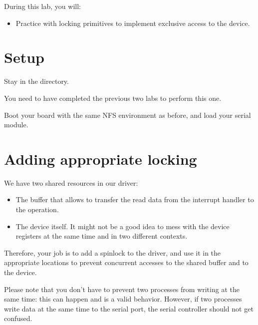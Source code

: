 
During this lab, you will:

\begin{itemize}
\item Practice with locking primitives to implement exclusive access
  to the device.
\end{itemize}

\section{Setup}

Stay in the  directory.

You need to have completed the previous two labs to perform this one.

Boot your board with the same NFS environment as before, and load your
serial module.

\section{Adding appropriate locking}

We have two shared resources in our driver:
\begin{itemize}

\item The buffer that allows to transfer the read data from the
  interrupt handler to the  operation.

\item The device itself. It might not be a good idea to mess with the
  device registers at the same time and in two different contexts.

\end{itemize}

Therefore, your job is to add a spinlock to the driver, and use it in
the appropriate locations to prevent concurrent accesses to the shared
buffer and to the device.

Please note that you don't have to prevent two processes from writing
at the same time: this can happen and is a valid behavior. However, if
two processes write data at the same time to the serial port, the
serial controller should not get confused.
